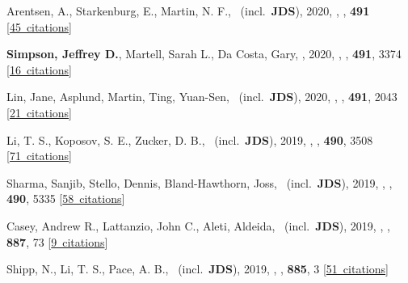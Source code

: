 \item[{\color{numcolor}\scriptsize39}] Arentsen, A., Starkenburg, E., Martin, N. F., \etal\ (incl.\ \textbf{JDS}), 2020, , \mnras, \textbf{491} [\href{https://ui.adsabs.harvard.edu/#abs/2020MNRAS.491L..11A}{45~citations}]

\item[{\color{numcolor}\scriptsize38}] \textbf{Simpson, Jeffrey D.}, Martell, Sarah L., Da Costa, Gary, \etal, 2020, , \mnras, \textbf{491}, 3374 [\href{https://ui.adsabs.harvard.edu/#abs/2020MNRAS.491.3374S}{16~citations}]

\item[{\color{numcolor}\scriptsize37}] Lin, Jane, Asplund, Martin, Ting, Yuan-Sen, \etal\ (incl.\ \textbf{JDS}), 2020, , \mnras, \textbf{491}, 2043 [\href{https://ui.adsabs.harvard.edu/#abs/2020MNRAS.491.2043L}{21~citations}]

\item[{\color{numcolor}\scriptsize36}] Li, T. S., Koposov, S. E., Zucker, D. B., \etal\ (incl.\ \textbf{JDS}), 2019, , \mnras, \textbf{490}, 3508 [\href{https://ui.adsabs.harvard.edu/#abs/2019MNRAS.490.3508L}{71~citations}]

\item[{\color{numcolor}\scriptsize35}] Sharma, Sanjib, Stello, Dennis, Bland-Hawthorn, Joss, \etal\ (incl.\ \textbf{JDS}), 2019, , \mnras, \textbf{490}, 5335 [\href{https://ui.adsabs.harvard.edu/#abs/2019MNRAS.490.5335S}{58~citations}]

\item[{\color{numcolor}\scriptsize34}] Casey, Andrew R., Lattanzio, John C., Aleti, Aldeida, \etal\ (incl.\ \textbf{JDS}), 2019, , \apj, \textbf{887}, 73 [\href{https://ui.adsabs.harvard.edu/#abs/2019ApJ...887...73C}{9~citations}]

\item[{\color{numcolor}\scriptsize33}] Shipp, N., Li, T. S., Pace, A. B., \etal\ (incl.\ \textbf{JDS}), 2019, , \apj, \textbf{885}, 3 [\href{https://ui.adsabs.harvard.edu/#abs/2019ApJ...885....3S}{51~citations}]

